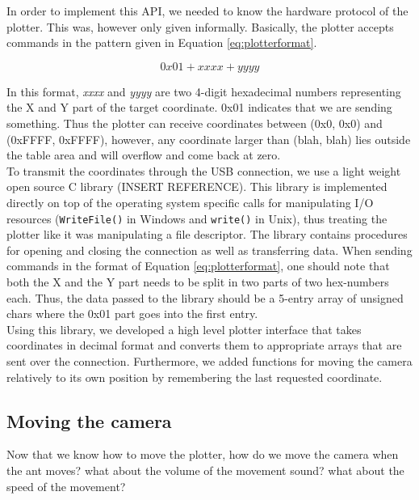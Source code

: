 In order to implement this API, we needed to know the hardware protocol of the plotter. This was, however only given informally. Basically, the plotter accepts commands in the pattern given in Equation \ref{eq:plotterformat}.

\begin{center}
  \begin{equation}
  \label{eq:plotterformat}
    0x01 +  xxxx +  yyyy
  \end{equation}
\end{center}

In this format, \textit{xxxx} and \textit{yyyy} are two 4-digit hexadecimal numbers representing the X and Y part of the target coordinate. 0x01 indicates that we are sending something. Thus the plotter can receive coordinates between (0x0, 0x0) and (0xFFFF, 0xFFFF), however, any coordinate larger than (blah, blah) lies outside the table area and will overflow and come back at zero. \\

To transmit the coordinates through the USB connection, we use a light weight open source C library (INSERT REFERENCE). This library is implemented directly on top of the operating system specific calls for manipulating I/O resources (\texttt{WriteFile()} in Windows and \texttt{write()} in Unix), thus treating the plotter like it was manipulating a file descriptor. The library contains procedures for opening and closing the connection as well as transferring data. When sending commands in the format of Equation \ref{eq:plotterformat}, one should note that both the X and the Y part needs to be split in two parts of two hex-numbers each. Thus, the data passed to the library should be a 5-entry array of unsigned chars where the 0x01 part goes into the first entry. \\

Using this library, we developed a high level plotter interface that takes coordinates in decimal format and converts them to appropriate arrays that are sent over the connection. Furthermore, we added functions for moving the camera relatively to its own position by remembering the last requested coordinate.


 
\subsection{Moving the camera}
Now that we know how to move the plotter, how do we move the camera when the ant moves?
what about the volume of the movement sound?
what about the speed of the movement?
